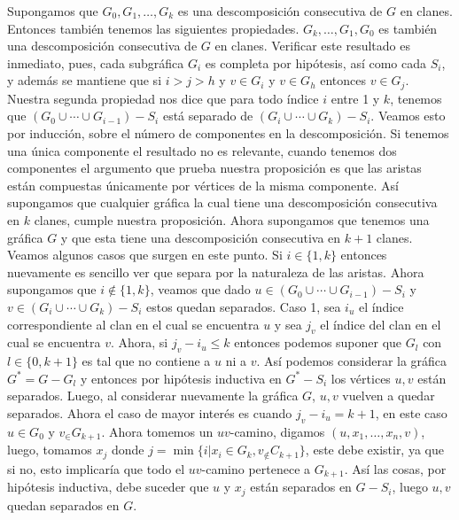 Supongamos que $G_0,G_1,\dots,G_k$ es una descomposición consecutiva de $G$ en clanes. Entonces también tenemos las siguientes propiedades. $G_k,\dots,G_1,G_0$ es también una descomposición consecutiva de $G$ en clanes. Verificar este resultado es inmediato, pues, cada subgráfica $G_i$ es completa por hipótesis, así como cada $S_i$, y además se mantiene que si $i>j>h$ y $v\in G_i$ y $v\in G_h$ entonces $v\in G_j$. Nuestra segunda propiedad nos dice que para todo índice $i$ entre 1 y $k$, tenemos que $(G_0\cup \cdots \cup G_{i-1})-S_i$ está separado de $(G_i \cup \cdots \cup G_k)-S_i$. Veamos esto por inducción, sobre el número de componentes en la descomposición. Si tenemos una única componente el resultado no es relevante, cuando tenemos dos componentes el argumento que prueba nuestra proposición es que las aristas están compuestas únicamente por vértices de la misma componente. Así supongamos que cualquier gráfica la cual tiene una descomposición consecutiva en $k$ clanes, cumple nuestra proposición. Ahora supongamos que tenemos una gráfica $G$ y que esta tiene una descomposición consecutiva en $k+1$ clanes. Veamos algunos casos que surgen en este punto. Si $i\in \{1,k\}$ entonces nuevamente es sencillo ver que separa por la naturaleza de las aristas. Ahora supongamos que $i\notin \{1,k\}$, veamos que dado $u\in (G_0\cup \cdots \cup G_{i-1})-S_i $ y $v \in (G_i \cup \cdots \cup G_k)-S_i $ estos quedan separados. Caso 1, sea $i_u$ el índice correspondiente al clan en el cual se encuentra $u$ y sea $j_v$ el índice del clan en el cual se encuentra $v$. Ahora, si $j_v-i_u\leq k$ entonces podemos suponer que $G_l$ con $l\in \{0,k+1\}$ es tal que no contiene a $u$ ni a $v$. Así podemos considerar la gráfica $G^*=G-G_l$ y entonces por hipótesis inductiva en $G^* - S_i$ los vértices $u,v$ están separados. Luego, al considerar nuevamente la gráfica $G$, $u,v$ vuelven a quedar separados. Ahora el caso de mayor interés es cuando $j_v-i_u = k+1$, en este caso $u\in G_0$ y $v_\in G_{k+1}$. Ahora tomemos un $uv$-camino, digamos $(u,x_1,\dots,x_n,v)$, luego, tomamos $x_j$ donde $j =\min\{i | x_i \in G_{k}, v_\notin C_{k+1}\}$, este debe existir, ya que si no, esto implicaría que todo el $uv$-camino pertenece a $G_{k+1} $. Así las cosas, por hipótesis inductiva, debe suceder que $u$ y $x_j$ están separados en $G-S_i$, luego $u,v$ quedan separados en $G$.

